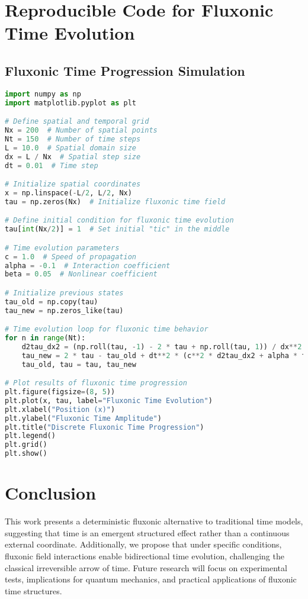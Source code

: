 \documentclass{article}
\begin{document}
\section{Reproducible Code for Fluxonic Time Evolution}
\subsection{Fluxonic Time Progression Simulation}
\begin{lstlisting}[language=Python]
import numpy as np
import matplotlib.pyplot as plt

# Define spatial and temporal grid
Nx = 200  # Number of spatial points
Nt = 150  # Number of time steps
L = 10.0  # Spatial domain size
dx = L / Nx  # Spatial step size
dt = 0.01  # Time step

# Initialize spatial coordinates
x = np.linspace(-L/2, L/2, Nx)
tau = np.zeros(Nx)  # Initialize fluxonic time field

# Define initial condition for fluxonic time evolution
tau[int(Nx/2)] = 1  # Set initial "tic" in the middle

# Time evolution parameters
c = 1.0  # Speed of propagation
alpha = -0.1  # Interaction coefficient
beta = 0.05  # Nonlinear coefficient

# Initialize previous states
tau_old = np.copy(tau)
tau_new = np.zeros_like(tau)

# Time evolution loop for fluxonic time behavior
for n in range(Nt):
    d2tau_dx2 = (np.roll(tau, -1) - 2 * tau + np.roll(tau, 1)) / dx**2
    tau_new = 2 * tau - tau_old + dt**2 * (c**2 * d2tau_dx2 + alpha * tau + beta * tau**3)
    tau_old, tau = tau, tau_new

# Plot results of fluxonic time progression
plt.figure(figsize=(8, 5))
plt.plot(x, tau, label="Fluxonic Time Evolution")
plt.xlabel("Position (x)")
plt.ylabel("Fluxonic Time Amplitude")
plt.title("Discrete Fluxonic Time Progression")
plt.legend()
plt.grid()
plt.show()
\end{lstlisting}

\section{Conclusion}
This work presents a deterministic fluxonic alternative to traditional time models, suggesting that time is an emergent structured effect rather than a continuous external coordinate. Additionally, we propose that under specific conditions, fluxonic field interactions enable bidirectional time evolution, challenging the classical irreversible arrow of time. Future research will focus on experimental tests, implications for quantum mechanics, and practical applications of fluxonic time structures.
\end{document}
